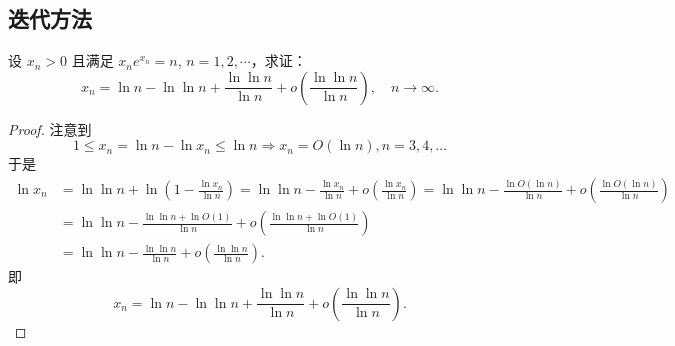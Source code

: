 \documentclass[lang=cn,10pt,thmcnt=section]{elegantbook}
\begin{document}
\subsection{迭代方法}
\begin{example}
	设 $x_n > 0$ 且满足 $x_n e^{x_n} = n$, $n = 1, 2, \cdots$，求证：
\[
x_n = \ln n - \ln \ln n + \frac{\ln \ln n}{\ln n} + o\left(\frac{\ln \ln n}{\ln n}\right), \quad n \to \infty.
\]
\end{example}
\begin{proof}
	注意到
$$ 1 \le x_n = \ln n - \ln x_n \le \ln n \Rightarrow x_n = O(\ln n), n=3, 4, \dots $$
于是
\begin{align*}
\ln x_n &= \ln \ln n + \ln\left(1 - \frac{\ln x_n}{\ln n}\right) = \ln \ln n - \frac{\ln x_n}{\ln n} + o\left(\frac{\ln x_n}{\ln n}\right) = \ln \ln n - \frac{\ln O(\ln n)}{\ln n} + o\left(\frac{\ln O(\ln n)}{\ln n}\right) \\
&= \ln \ln n - \frac{\ln \ln n + \ln O(1)}{\ln n} + o\left(\frac{\ln \ln n + \ln O(1)}{\ln n}\right) \\
&= \ln \ln n - \frac{\ln \ln n}{\ln n} + o\left(\frac{\ln \ln n}{\ln n}\right).
\end{align*}
即
$$ x_n = \ln n - \ln \ln n + \frac{\ln \ln n}{\ln n} + o\left(\frac{\ln \ln n}{\ln n}\right). $$

\end{proof}
\end{document}
